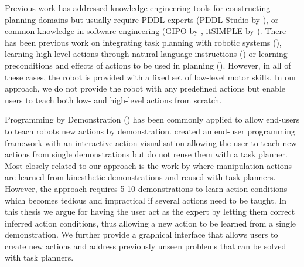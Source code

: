 Previous work has addressed knowledge engineering tools for constructing planning domains but usually require PDDL experts (PDDL Studio by \cite{plch2012inspect}), or common knowledge in software engineering (GIPO by \cite{simpson2007planning}, itSIMPLE by \cite{vaquero2013itsimple}).
There has been previous work on integrating task planning with robotic systems (\cite{cashmore2015rosplan,kuhner2018closed}), learning high-level actions through natural language instructions (\cite{she2014teaching}) or learning preconditions and effects of actions to be used in planning (\cite{jetchev2013learning,konidaris2018fromSkills,ugur2015bottom}).
However, in all of these cases, the robot is provided with a fixed set of low-level motor skills.
In our approach, we do not provide the robot with any predefined actions but enable users to teach both low- and high-level actions from scratch.

Programming by Demonstration () has been commonly applied to allow end-users to teach robots new actions by demonstration.
\citet{alexandrova2014robot} created an end-user programming framework with an interactive action visualisation allowing the user to teach new actions from single demonstrations but do not reuse them with a task planner.
Most closely related to our approach is the work by \citet{abdo2013learning} where manipulation actions are learned from kinesthetic demonstrations and reused with task planners.
However, the approach requires 5-10 demonstrations to learn action conditions which becomes tedious and impractical if several actions need to be taught.
In this thesis we argue for having the user act as the expert by letting them correct inferred action conditions, thus allowing a new action to be learned from a single demonstration.
We further provide a graphical interface that allows users to create new actions and address previously unseen problems that can be solved with task planners.


